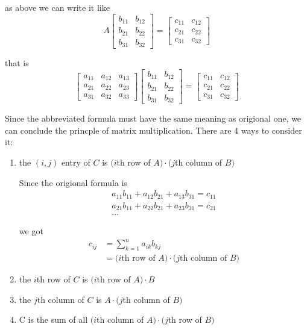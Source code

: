 \documentclass{article}
\begin{document}
    as above we can write it like
    \begin{equation*}
        A\begin{bmatrix}
            b_{11}&b_{12}\\
            b_{21}&b_{22}\\
            b_{31}&b_{32}
        \end{bmatrix}=
        \begin{bmatrix}
            c_{11}&c_{12}\\
            c_{21}&c_{22}\\
            c_{31}&c_{32}
        \end{bmatrix}
    \end{equation*}

    that is
    \begin{equation*}
        \begin{bmatrix}a_{11}&a_{12}&a_{13}\\a_{21}&a_{22}&a_{23}\\a_{31}&a_{32}&a_{33}\end{bmatrix}
        \begin{bmatrix}b_{11}&b_{12}\\b_{21}&b_{22}\\b_{31}&b_{32}\end{bmatrix}
            =
        \begin{bmatrix}c_{11}&c_{12}\\c_{21}&c_{22}\\c_{31}&c_{32}\end{bmatrix}
    \end{equation*}

    Since the abbreviated formula must have the same meaning as origional one, we can conclude the princple of matrix multiplication. There are 4 ways to consider it:
    \begin{enumerate}
        \item the $(i,j)$ entry of $C$ is $(i$th row of $A)\cdot(j$th column of $B)$
    
            Since the origional formula is$$\begin{gathered}a_{11}b_{11}+a_{12}b_{21}+a_{13}b_{31}=c_{11}\\a_{21}b_{11}+a_{22}b_{21}+a_{23}b_{31}=c_{21}\\\dots\end{gathered}$$

            we got$$\begin{aligned}c_{ij}&=\sum_{k=1}^{n}a_{ik}b_{kj}\\&=\text{(} i\text{th row of }A\text{)}\cdot\text{(}j\text{th column of }B)\end{aligned}$$

        \item the $i$th row of $C$ is $(i$th row of $A)\cdot B$
        \item the $j$th column of $C$ is $A\cdot (j$th column of $B)$
        \item C is the sum of all $(i$th column of $A)\cdot(j$th row of $B)$
    \end{enumerate}
\end{document}
